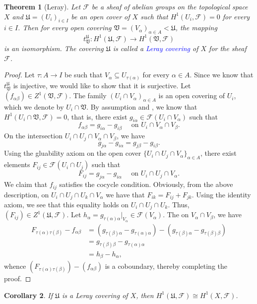 \documentclass[12pt]{article}
\theoremstyle{thmstyle}
\newtheorem{theorem}{Theorem}[section]
\theoremstyle{defstyle}
\newtheorem{corollary}[theorem]{Corollary}
\newcommand{\frakU}{\mathfrak{U}}
\newcommand{\frakV}{\mathfrak{V}}
\newcommand{\scrF}{\mathscr F}
\newcommand{\define}[1]{\textcolor{blue}{\textit{#1}}}
\begin{document}
\begin{theorem}[Leray]
    Let $\scrF$ be a sheaf of abelian groups on the topological space $X$ and $\frakU = (U_i)_{i\in I}$ be an open cover of $X$ such that $H^1(U_i,\scrF) = 0$ for every $i\in I$. Then for every open covering $\frakV = (V_\alpha)_{\alpha\in A} < \frakU$, the mapping 
    \begin{equation*}
        t^{\frakU}_{\frakV} : H^1(\frakU,\scrF)\to H^1(\frakV,\scrF)
    \end{equation*}
    is an isomorphism. The covering $\frakU$ is called a \define{Leray covering} of $X$ for the sheaf $\scrF$.
\end{theorem}
\begin{proof}
    Let $\tau: A\to I$ be such that $V_\alpha\subseteq U_{\tau(\alpha)}$ for every $\alpha\in A$. Since we know that $t^{\frakU}_{\frakV}$ is injective, we would like to show that it is surjective. Let $(f_{\alpha\beta})\in Z^1(\frakV,\scrF)$. The family $(U_i\cap V_\alpha)_{\alpha\in A}$ is an open covering of $U_i$, which we denote by $U_i\cap\frakV$. By assumption and , we know that $H^1(U_i\cap\frakV,\scrF) = 0$, that is, there exist $g_{i\alpha}\in\scrF(U_i\cap V_\alpha)$ such that 
    \begin{equation*}
        f_{\alpha\beta} = g_{i\alpha} - g_{i\beta}\quad\text{ on } U_i\cap V_\alpha\cap V_\beta.
    \end{equation*}
    On the intersection $U_i\cap U_j\cap V_\alpha\cap V_\beta$, we have 
    \begin{equation*}
        g_{j\alpha} - g_{i\alpha} = g_{j\beta} - g_{i\beta}.
    \end{equation*}
    Using the gluability axiom on the open cover $\{U_i\cap U_j\cap V_\alpha\}_{\alpha\in A}$, there exist elements $F_{ij}\in\scrF(U_i\cap U_j)$ such that 
    \begin{equation*}
        F_{ij} = g_{j\alpha} - g_{i\alpha}\quad\text{ on } U_i\cap U_j\cap V_\alpha.
    \end{equation*}
    We claim that $f_{ij}$ satisfies the cocycle condition. Obviously, from the above description, on $U_i\cap U_j\cap U_k\cap V_\alpha$ we have that $F_{ik} = F_{ij} + F_{jk}$. Using the identity axiom, we see that this equality holds on $U_i\cap U_j\cap U_k$. Thus, $(F_{ij})\in Z^1(\frakU,\scrF)$. Let $h_\alpha = g_{\tau(\alpha)\alpha}|_{V_\alpha}\in\scrF(V_\alpha)$. The on $V_\alpha\cap V_\beta$, we have 
    \begin{align*}
        F_{\tau(\alpha)\tau(\beta)} - f_{\alpha\beta} &= \left(g_{\tau(\beta)\alpha} - g_{\tau(\alpha)\alpha}\right) - \left(g_{\tau(\beta)\alpha} - g_{\tau(\beta)\beta}\right)\\
        &= g_{\tau(\beta)\beta} - g_{\tau(\alpha)\alpha}\\
        &= h_\beta - h_\alpha,
    \end{align*}
    whence $(F_{\tau(\alpha)\tau(\beta)}) - (f_{\alpha\beta})$ is a coboundary, thereby completing the proof.
\end{proof}

\begin{corollary}
    If $\frakU$ is a Leray covering of $X$, then $H^1(\frakU,\scrF)\cong H^1(X,\scrF)$.
\end{corollary}
\end{document}
